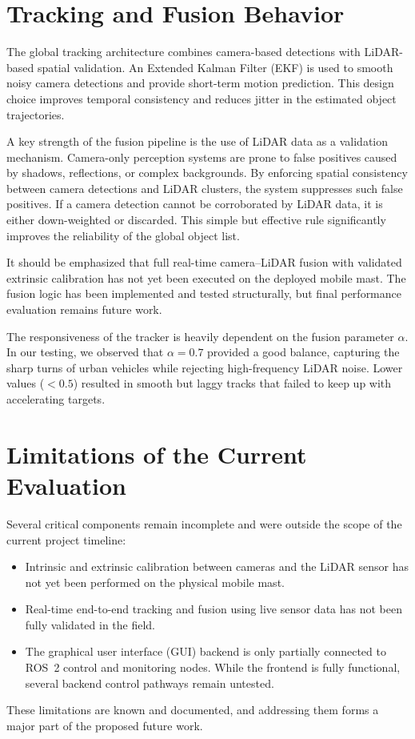 \documentclass[12pt,a4paper]{report}
\begin{document}
{\section{Tracking and Fusion Behavior}
The global tracking architecture combines camera-based detections with LiDAR-based spatial validation. An Extended Kalman Filter (EKF) is used to smooth noisy camera detections and provide short-term motion prediction. This design choice improves temporal consistency and reduces jitter in the estimated object trajectories.

A key strength of the fusion pipeline is the use of LiDAR data as a validation mechanism. Camera-only perception systems are prone to false positives caused by shadows, reflections, or complex backgrounds. By enforcing spatial consistency between camera detections and LiDAR clusters, the system suppresses such false positives. If a camera detection cannot be corroborated by LiDAR data, it is either down-weighted or discarded. This simple but effective rule significantly improves the reliability of the global object list.

It should be emphasized that full real-time camera–LiDAR fusion with validated extrinsic calibration has not yet been executed on the deployed mobile mast. The fusion logic has been implemented and tested structurally, but final performance evaluation remains future work.

The responsiveness of the tracker is heavily dependent on the fusion parameter $\alpha$. In our testing, we observed that $\alpha=0.7$ provided a good balance, capturing the sharp turns of urban vehicles while rejecting high-frequency LiDAR noise. Lower values ($<0.5$) resulted in smooth but laggy tracks that failed to keep up with accelerating targets.

\section{Limitations of the Current Evaluation}
Several critical components remain incomplete and were outside the scope of the current project timeline:
\begin{itemize}
    \item Intrinsic and extrinsic calibration between cameras and the LiDAR sensor has not yet been performed on the physical mobile mast.
    \item Real-time end-to-end tracking and fusion using live sensor data has not been fully validated in the field.
    \item The graphical user interface (GUI) backend is only partially connected to ROS~2 control and monitoring nodes. While the frontend is fully functional, several backend control pathways remain untested.
\end{itemize}
These limitations are known and documented, and addressing them forms a major part of the proposed future work.

}
\end{document}
